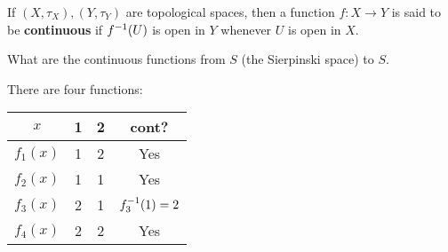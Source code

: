 \documentclass[12pt, twosided]{article}
\begin{document}
\begin{df}
  If \((X, \tau_X), (Y, \tau_Y)\) are topological spaces, then a function \(f: X \to Y\) is said to be \textbf{continuous} if \(f^{-1}(U)\) is open in \(Y\) whenever \(U\) is open in \(X\).
\end{df}

\begin{exa}
  What are the continuous functions from  \(S\) (the Sierpinski space) to \(S\).

  There are four functions:
  \begin{center}
    \begin{tabular}[h]{c|cc|c}
      \(x\) & 1 & 2 & cont?\\
      \hline
      \(f_1(x)\) & 1 & 2 & Yes\\
      \(f_2(x)\) & 1 & 1 & Yes\\
      \(f_3(x)\) & 2 & 1 & \(f_3^{-1}({1}) = {2}\)\\
      \(f_4(x)\) & 2 & 2 & Yes
    \end{tabular}
  \end{center}
\end{exa}
\end{document}
